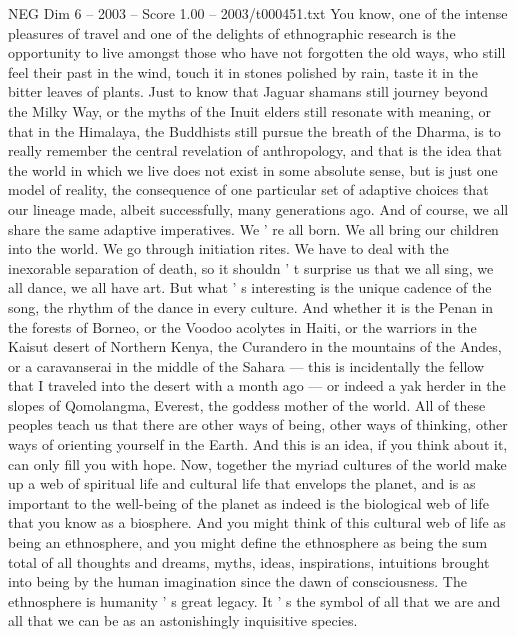\begin{textsample}{NEG Dim 6 – 2003 – Score 1.00 – 2003/t000451.txt}  \label{ex:f6_neg_057}
You know, one of the intense pleasures of travel and one of the delights of ethnographic research is the opportunity to live amongst those who have not forgotten the old ways, who still feel their past in the wind, touch it in stones polished by rain, taste it in the bitter leaves of plants.
Just to know that Jaguar shamans still journey beyond the Milky Way, or the myths of the Inuit elders still resonate with meaning, or that in the Himalaya, the Buddhists still pursue the breath of the Dharma, is to really remember the central revelation of anthropology, and that is the idea that the world in which we live does not exist in some absolute sense, but is just one model of reality, the consequence of one particular set of adaptive choices that our lineage made, albeit successfully, many generations ago.
And of course, we all share the same adaptive imperatives.
We ' re all born.
We all bring our children into the world.
We go through initiation rites.
We have to deal with the inexorable separation of death, so it shouldn ' t surprise us that we all sing, we all dance, we all have art.
But what ' s interesting is the unique cadence of the song, the rhythm of the dance in every culture.
And whether it is the Penan in the forests of Borneo, or the Voodoo acolytes in Haiti, or the warriors in the Kaisut desert of Northern Kenya, the Curandero in the mountains of the Andes, or a caravanserai in the middle of the Sahara — this is incidentally the fellow that I traveled into the desert with a month ago — or indeed a yak herder in the slopes of Qomolangma, Everest, the goddess mother of the world.
All of these peoples teach us that there are other ways of being, other ways of thinking, other ways of orienting yourself in the Earth.
And this is an idea, if you think about it, can only fill you with hope.
Now, together the myriad cultures of the world make up a web of spiritual life and cultural life that envelops the planet, and is as important to the well-being of the planet as indeed is the biological web of life that you know as a biosphere.
And you might think of this cultural web of life as being an ethnosphere, and you might define the ethnosphere as being the sum total of all thoughts and dreams, myths, ideas, inspirations, intuitions brought into being by the human imagination since the dawn of consciousness.
The ethnosphere is humanity ' s great legacy.
It ' s the symbol of all that we are and all that we can be as an astonishingly inquisitive species.

\end{textsample}
